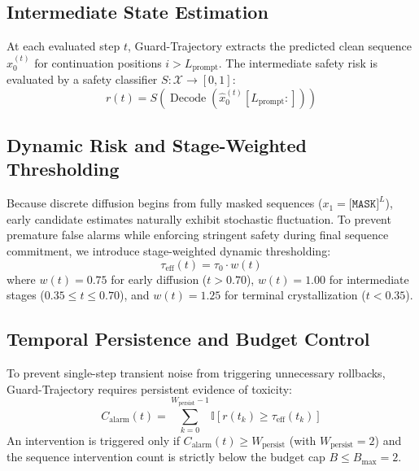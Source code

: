 \documentclass[conference]{IEEEtran}
\begin{document}
\subsection{Intermediate State Estimation}
At each evaluated step $t$, Guard-Trajectory extracts the predicted clean sequence $\hat{x}_0^{(t)}$ for continuation positions $i > L_{\text{prompt}}$. The intermediate safety risk is evaluated by a safety classifier $S: \mathcal{X} \to [0, 1]$:
\begin{equation}
    r(t) = S(\operatorname{Decode}(\hat{x}_0^{(t)}[L_{\text{prompt}}:]))
\end{equation}

\subsection{Dynamic Risk and Stage-Weighted Thresholding}
Because discrete diffusion begins from fully masked sequences ($x_1 = \texttt{[MASK]}^L$), early candidate estimates naturally exhibit stochastic fluctuation. To prevent premature false alarms while enforcing stringent safety during final sequence commitment, we introduce stage-weighted dynamic thresholding:
\begin{equation}
    \tau_{\text{eff}}(t) = \tau_0 \cdot w(t)
\end{equation}
where $w(t) = 0.75$ for early diffusion ($t > 0.70$), $w(t) = 1.00$ for intermediate stages ($0.35 \le t \le 0.70$), and $w(t) = 1.25$ for terminal crystallization ($t < 0.35$).

\subsection{Temporal Persistence and Budget Control}
To prevent single-step transient noise from triggering unnecessary rollbacks, Guard-Trajectory requires persistent evidence of toxicity:
\begin{equation}
    C_{\text{alarm}}(t) = \sum_{k=0}^{W_{\text{persist}}-1} \mathbb{I}[r(t_k) \ge \tau_{\text{eff}}(t_k)]
\end{equation}
An intervention is triggered only if $C_{\text{alarm}}(t) \ge W_{\text{persist}}$ (with $W_{\text{persist}} = 2$) and the sequence intervention count is strictly below the budget cap $B \le B_{\text{max}} = 2$.
\end{document}
